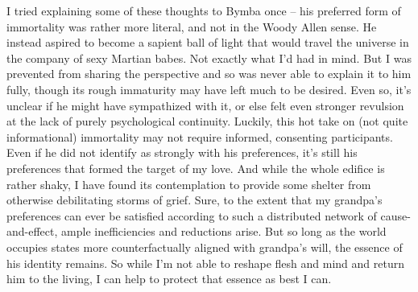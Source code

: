 \documentclass[twoside,10pt]{article}
\begin{document}
\begin{article*}
I tried explaining some of these thoughts to Bymba once – his preferred form of immortality was rather more literal, and not in the Woody Allen sense. He instead aspired to become a sapient ball of light that would travel the universe in the company of sexy Martian babes. Not exactly what I’d had in mind. But I was prevented from sharing the perspective and so was never able to explain it to him fully, though its rough immaturity may have left much to be desired. Even so, it’s unclear if he might have sympathized with it, or else felt even stronger revulsion at the lack of purely psychological continuity. Luckily, this hot take on (not quite informational) immortality may not require informed, consenting participants. Even if he did not identify as strongly with his preferences, it’s still his preferences that formed the target of my love. And while the whole edifice is rather shaky, I have found its contemplation to provide some shelter from otherwise debilitating storms of grief. Sure, to the extent that my grandpa’s preferences can ever be satisfied according to such a distributed network of cause-and-effect, ample inefficiencies and reductions arise. But so long as the world occupies states more counterfactually aligned with grandpa’s will, the essence of his identity remains. So while I’m not able to reshape flesh and mind and return him to the living, I can help to protect that essence as best I can. 
\\


\end{article*}
\end{document}

